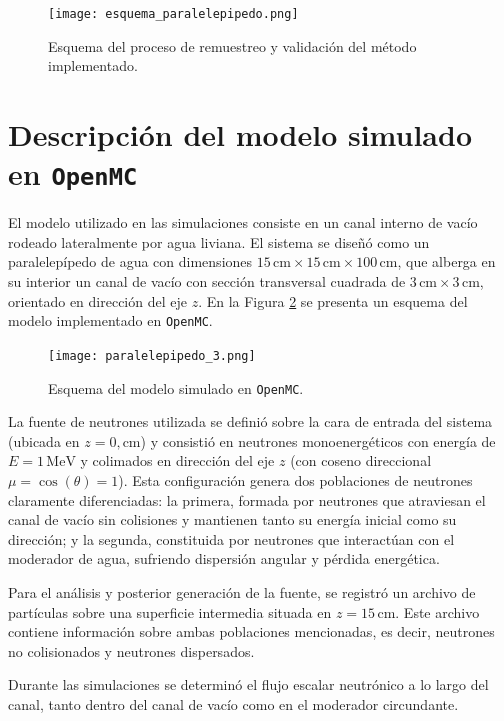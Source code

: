 \begin{figure}[h]
    \centering
    \texttt{[image: esquema\_paralelepipedo.png]}
    \caption{Esquema del proceso de remuestreo y validación del método implementado.}
    \label{fig:esquema_remuestreo}
\end{figure}

\section{Descripción del modelo simulado en \texttt{OpenMC}}

El modelo utilizado en las simulaciones consiste en un canal interno de vacío rodeado lateralmente por agua liviana. El sistema se diseñó como un paralelepípedo de agua con dimensiones $15\,\text{cm} \times 15\,\text{cm} \times 100\,\text{cm}$, que alberga en su interior un canal de vacío con sección transversal cuadrada de $3\,\text{cm} \times 3\,\text{cm}$, orientado en dirección del eje $z$. En la Figura \ref{fig:modelo_simulado_openmc} se presenta un esquema del modelo implementado en \texttt{OpenMC}.

\begin{figure}[h]
    \centering
    \texttt{[image: paralelepipedo\_3.png]}
    \caption{Esquema del modelo simulado en \texttt{OpenMC}.}
    \label{fig:modelo_simulado_openmc}
\end{figure}

La fuente de neutrones utilizada se definió sobre la cara de entrada del sistema (ubicada en $z = 0,\text{cm}$) y consistió en neutrones monoenergéticos con energía de $E = 1\,\text{MeV}$ y colimados en dirección del eje $z$ (con coseno direccional $\mu = \cos(\theta) = 1$). Esta configuración genera dos poblaciones de neutrones claramente diferenciadas: la primera, formada por neutrones que atraviesan el canal de vacío sin colisiones y mantienen tanto su energía inicial como su dirección; y la segunda, constituida por neutrones que interactúan con el moderador de agua, sufriendo dispersión angular y pérdida energética.

Para el análisis y posterior generación de la fuente, se registró un archivo de partículas sobre una superficie intermedia situada en $z = 15\,\text{cm}$. Este archivo contiene información sobre ambas poblaciones mencionadas, es decir, neutrones no colisionados y neutrones dispersados.

Durante las simulaciones se determinó el flujo escalar neutrónico a lo largo del canal, tanto dentro del canal de vacío como en el moderador circundante.

